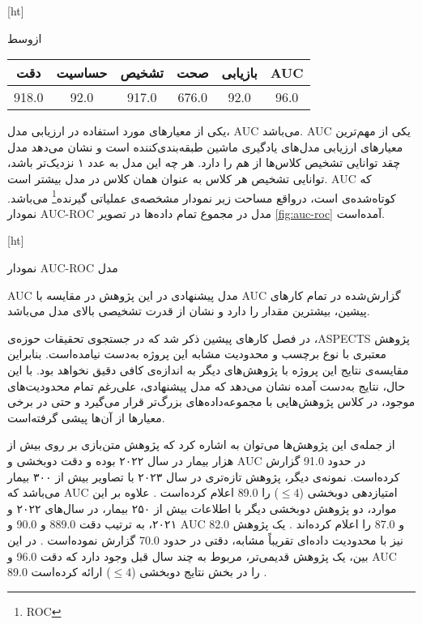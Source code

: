 
[ht]

\vspace{1.5em}

‌ازوسط

\begin{tabular}{cccccc}
    \hline
     
    دقت     & حساسیت & تشخیص & صحت     & بازیابی   & AUC \\ \hline
    918.0   & 92.0    & 917.0 & 676.0   & 92.0       & 96.0   \\ \hline
    \end{tabular}


یکی از معیار‌های مورد استفاده در ارزیابی مدل، AUC می‌باشد.
AUC یکی از مهم‌ترین معیارهای ارزیابی مدل‌های یادگیری ماشین طبقه‌بندی‌کننده است و
نشان می‌دهد مدل چقد توانایی تشخیص کلاس‌ها از هم را دارد.
هر چه این مدل به عدد ۱ نزدیک‌تر باشد، توانایی تشخیص هر کلاس به عنوان همان کلاس در مدل بیشتر است.
AUC که کوتاه‌شده‌ی  است، درواقع مساحت زیر نمودار مشخصه‌ی عملیاتی گیرنده\footnote{ROC} می‌باشد.
نمودار AUC-ROC مدل در مجموع تمام داده‌ها در تصویر \ref{fig:auc-roc} آمده‌است.

[ht]
\caption[نمودار AUC-ROC مدل]{نمودار AUC-ROC مدل}

AUC مدل پیشنهادی در این پژوهش در مقایسه با AUC گزارش‌شده در تمام کار‌های پیشین، بیشترین مقدار را دارد و نشان از قدرت تشخیصی بالای مدل می‌باشد.


در فصل کارهای پیشین ذکر شد که در جستجوی تحقیقات حوزه‌ی ،ASPECTS
پژوهش معتبری با نوع برچسب و محدودیت مشابه این پروژه به‌دست نیامده‌است.
بنابراین مقایسه‌ی نتایج این پروژه با پژوهش‌های دیگر به اندازه‌ی کافی دقیق نخواهد بود.
با این حال،
نتایج به‌دست آمده نشان می‌دهد که
مدل پیشنهادی، علی‌رغم تمام محدودیت‌های موجود، در کلاس پژوهش‌هایی با مجموعه‌داده‌های بزرگ‌تر قرار می‌گیرد و
حتی در برخی معیارها از آن‌ها پیشی گرفته‌است.

از جمله‌ی این پژوهش‌ها  
می‌توان به 
\cite{cao2022deep} اشاره کرد که 
پژوهش متن‌بازی بر روی بیش از هزار بیمار در سال ۲۰۲۲ بوده و دقت دوبخشی و AUC در حدود 91.0 گزارش کرده‌است.
نمونه‌ی دیگر، پژوهش تازه‌تری در سال ۲۰۲۳ با تصاویر بیش از ۳۰۰ بیمار می‌باشد که AUC امتیازدهی دوبخشی ($\leq 4$) را 89.0 اعلام کرده‌است \cite{lee2023clinical}.
علاوه بر این موارد، دو پژوهش دوبخشی دیگر با اطلاعات بیش از ۲۵۰ بیمار، در سال‌های ۲۰۲۲ و ۲۰۲۱، به ترتیب دقت
889.0 و
90.0
و
AUC
82.0 
و 
87.0 
را اعلام کرده‌اند \cite{chiang2022deep,kuang2021eis}.
یک پژوهش نیز با محدودیت داده‌ای تقریباً مشابه، دقتی در حدود 70.0 گزارش نموده‌است \cite{yu2021automated}.
در این بین، یک پژوهش قدیمی‌تر، مربوط به چند سال قبل وجود دارد که دقت 96.0 و AUC 89.0 را در بخش نتایج دو‌بخشی ($\leq 4$) ارائه کرده‌است \cite{kuang2019automated}.

